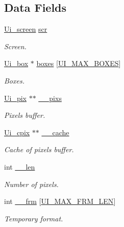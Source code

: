 \subsection*{Data Fields}
\begin{DoxyCompactItemize}
\item 
\mbox{\label{struct__Ui_abd7c2a78bbdbe0e91a47a1461660b747}} 
\hyperlink{struct__Ui__screen}{Ui\+\_\+screen} \hyperlink{struct__Ui_abd7c2a78bbdbe0e91a47a1461660b747}{scr}
\begin{DoxyCompactList}\small\item\em Screen. \end{DoxyCompactList}\item 
\mbox{\label{struct__Ui_ab4d33275d1afe8817a640653ab4b6848}} 
\hyperlink{struct__Ui__box}{Ui\+\_\+box} $\ast$ \hyperlink{struct__Ui_ab4d33275d1afe8817a640653ab4b6848}{boxes} \mbox{[}\hyperlink{ui_8c_a1be73fb0e5253951bdb7f2a4bd6a1524}{U\+I\+\_\+\+M\+A\+X\+\_\+\+B\+O\+X\+ES}\mbox{]}
\begin{DoxyCompactList}\small\item\em Boxes. \end{DoxyCompactList}\item 
\mbox{\label{struct__Ui_a11af896bffe4bdbeca5ca871f7a9b7f0}} 
\hyperlink{struct__Ui__pix}{Ui\+\_\+pix} $\ast$$\ast$ \hyperlink{struct__Ui_a11af896bffe4bdbeca5ca871f7a9b7f0}{\+\_\+\+\_\+pixs}
\begin{DoxyCompactList}\small\item\em Pixels buffer. \end{DoxyCompactList}\item 
\mbox{\label{struct__Ui_ae8d7a2dd759ef8a64ce7d93d56c671d1}} 
\hyperlink{struct__Ui__cpix}{Ui\+\_\+cpix} $\ast$$\ast$ \hyperlink{struct__Ui_ae8d7a2dd759ef8a64ce7d93d56c671d1}{\+\_\+\+\_\+cache}
\begin{DoxyCompactList}\small\item\em Cache of pixels buffer. \end{DoxyCompactList}\item 
\mbox{\label{struct__Ui_a368b423615ed2b6852c1ca99fd6351ce}} 
int \hyperlink{struct__Ui_a368b423615ed2b6852c1ca99fd6351ce}{\+\_\+\+\_\+len}
\begin{DoxyCompactList}\small\item\em Number of pixels. \end{DoxyCompactList}\item 
\mbox{\label{struct__Ui_a2e557f044026b3a80e8a4a60d43a31cd}} 
int \hyperlink{struct__Ui_a2e557f044026b3a80e8a4a60d43a31cd}{\+\_\+\+\_\+frm} \mbox{[}\hyperlink{ui_8c_aab208380ff579bef5fd8b91fa0c0215a}{U\+I\+\_\+\+M\+A\+X\+\_\+\+F\+R\+M\+\_\+\+L\+EN}\mbox{]}
\begin{DoxyCompactList}\small\item\em Temporary format. \end{DoxyCompactList}\end{DoxyCompactItemize}


